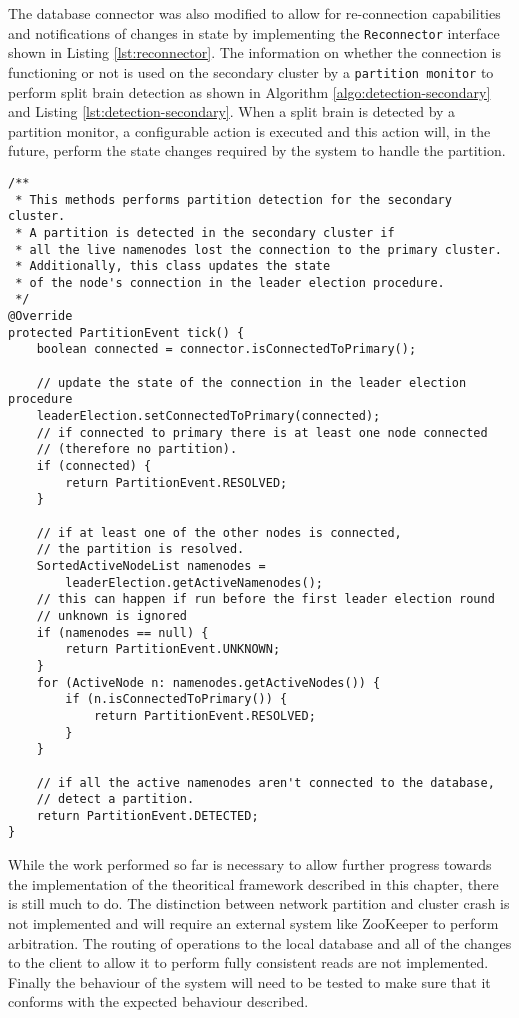 The database connector was also modified to allow for re-connection capabilities and notifications of changes in state by implementing the \texttt{Reconnector} interface shown in Listing \ref{lst:reconnector}.
The information on whether the connection is functioning or not is used on the secondary cluster by a \texttt{partition monitor} to perform split brain detection as shown in Algorithm \ref{algo:detection-secondary} and Listing \ref{lst:detection-secondary}.
When a split brain is detected by a partition monitor, a configurable action is executed and this action will, in the future, perform the state changes required by the system to handle the partition.
\begin{lstlisting}[caption={Implementation of the partition detection algorithm in the secondary cluster}, label={lst:detection-secondary}]
/**
 * This methods performs partition detection for the secondary cluster.
 * A partition is detected in the secondary cluster if 
 * all the live namenodes lost the connection to the primary cluster.
 * Additionally, this class updates the state 
 * of the node's connection in the leader election procedure.
 */
@Override
protected PartitionEvent tick() {
    boolean connected = connector.isConnectedToPrimary();

    // update the state of the connection in the leader election procedure
    leaderElection.setConnectedToPrimary(connected);
    // if connected to primary there is at least one node connected
    // (therefore no partition).
    if (connected) {
        return PartitionEvent.RESOLVED;
    }

    // if at least one of the other nodes is connected,
    // the partition is resolved.
    SortedActiveNodeList namenodes = 
        leaderElection.getActiveNamenodes();
    // this can happen if run before the first leader election round
    // unknown is ignored
    if (namenodes == null) {
        return PartitionEvent.UNKNOWN;
    }
    for (ActiveNode n: namenodes.getActiveNodes()) {
        if (n.isConnectedToPrimary()) {
            return PartitionEvent.RESOLVED;
        }
    }

    // if all the active namenodes aren't connected to the database,
    // detect a partition.
    return PartitionEvent.DETECTED;
}
\end{lstlisting}

While the work performed so far is necessary to allow further progress towards the implementation of the theoritical framework described in this chapter, there is still much to do.
The distinction between network partition and cluster crash is not implemented and will require an external system like ZooKeeper to perform arbitration.
The routing of operations to the local database and all of the changes to the client to allow it to perform fully consistent reads are not implemented.
Finally the behaviour of the system will need to be tested to make sure that it conforms with the expected behaviour described.
